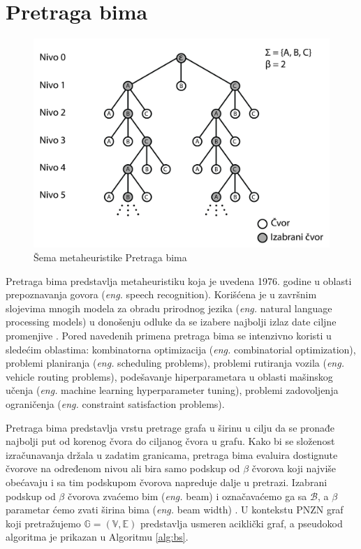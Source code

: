 \documentclass[12pt,oneside]{memoir}
\begin{document}
\section{Pretraga bima}
\label{sec:pretragaBima}
\begin{figure}[!ht]
  \centering
  \includegraphics[width=1\textwidth]{Slike/bs1.png}
  \caption{Šema metaheuristike Pretraga bima} 
  \label{fig:pretragaBima}
\end{figure}
Pretraga bima predstavlja metaheuristiku koja je uvedena 1976. godine u oblasti prepoznavanja govora
(\textit{eng.} speech recognition). Korišćena je u završnim slojevima mnogih modela za
obradu prirodnog jezika (\textit{eng.} natural language processing models) u donošenju odluke da se izabere najbolji
izlaz date ciljne promenjive \cite{BSIntroduction}. Pored navedenih primena pretraga bima se intenzivno koristi u sledećim
oblastima: kombinatorna optimizacija (\textit{eng.} combinatorial optimization), problemi planiranja (\textit{eng.} scheduling problems),
problemi rutiranja vozila (\textit{eng.} vehicle routing problems), podešavanje hiperparametara u oblasti mašinskog učenja
(\textit{eng.} machine learning hyperparameter tuning), problemi zadovoljenja ograničenja (\textit{eng.} constraint satisfaction problems). 

Pretraga bima predstavlja vrstu pretrage grafa u širinu u cilju da
se pronađe najbolji put od korenog čvora do ciljanog čvora u grafu. Kako bi se složenost izračunavanja držala u
zadatim granicama, pretraga bima evaluira dostignute čvorove na određenom nivou ali bira samo podskup od $\beta$
čvorova koji najviše obećavaju i sa tim podskupom čvorova napreduje dalje u pretrazi. Izabrani podskup od $\beta$ čvorova
zvaćemo bim (\textit{eng.} beam) i označavaćemo ga sa $\mathcal{B}$, a $\beta$ parametar ćemo zvati širina bima (\textit{eng.} beam width) \cite{SCSBS}.
U kontekstu PNZN graf koji pretražujemo $\mathbb{G}=(\mathbb{V},\mathbb{E})$ predstavlja usmeren aciklički graf, 
a pseudokod algoritma je prikazan u Algoritmu \ref{alg:bs}.
\end{document}

